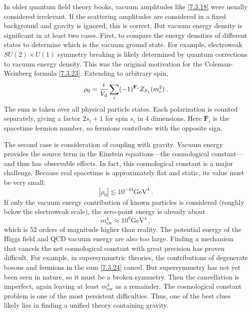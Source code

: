 In older quantum field theory books, vacuum amplitudes like \eqref{7.3.18} were usually considered irrelevant. 
If the scattering amplitudes are considered in a fixed background and gravity is ignored, this is correct. But vacuum energy density is significant in at least two cases. First, to compare the energy densities of different states to determine which is the vacuum ground state. For example, electroweak $S U(2) \times U(1)$ symmetry breaking is likely determined by quantum corrections to vacuum energy density. This was the original motivation for the Coleman-Weinberg formula \eqref{7.3.23}. Extending to arbitrary spin, 
\begin{equation}
	\rho_{0}=\frac{i}{V_{d}} \sum_{i}(-1)^{\mathbf{F}_{i}} Z_{S_{1}}(m_{i}^{2}) \:. \label{7.3.24} 
\end{equation}
The sum is taken over all physical particle states. Each polarization is counted separately, giving a factor $2 s_{i}+1$ for spin $s_{i}$ in 4 dimensions. Here $\mathbf{F}_{i}$ is the spacetime fermion number, so fermions contribute with the opposite sign. 

The second case is consideration of coupling with gravity. Vacuum energy provides the source term in the Einstein equations—the cosmological constant—and thus has observable effects. In fact, this cosmological constant is a major challenge. Because real spacetime is approximately flat and static, its value must be very small: 
\begin{equation}
	|\rho_{0}| \lesssim 10^{-44} \mathrm{GeV}^{4} \:. \label{7.3.25} 
\end{equation}
If only the vacuum energy contribution of known particles is considered (roughly below the electroweak scale), the zero-point energy is already about 
\begin{equation}
	m_{\mathrm{ew}}^{4} \approx 10^{8} \mathrm{GeV}^{4} \:, \label{7.3.26} 
\end{equation}
which is 52 orders of magnitude higher than reality. The potential energy of the Higgs field and QCD vacuum energy are also too large. Finding a mechanism that cancels the net cosmological constant with great precision has proven difficult. For example, in supersymmetric theories, the contributions of degenerate bosons and fermions in the sum \eqref{7.3.24} cancel. But supersymmetry has not yet been seen in nature, so it must be a broken symmetry. Then the cancellation is imperfect, again leaving at least $m_{\mathrm{ew}}^{4} $ as a remainder. The cosmological constant problem is one of the most persistent difficulties. 
Thus, one of the best clues likely lies in finding a unified theory containing gravity. 

